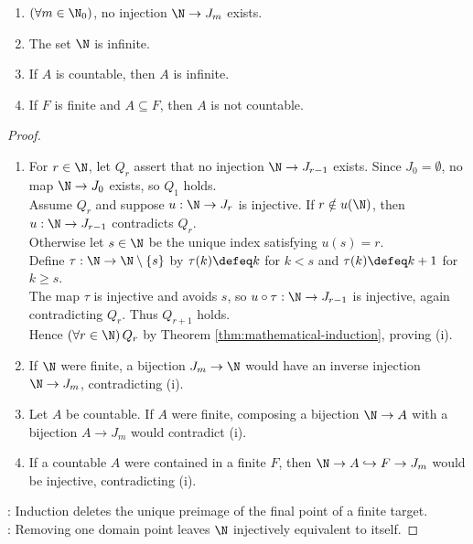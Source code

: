 \begin{proposition} \label{prop:natural-numbers-do-not-inject-into-finite-sets} 
\begin{enumerate}[label=(\roman*)]
\setlength{\itemsep}{0pt}
\item $(\forall m\in\N_0)$, no injection $\N\to J_m$ exists.
\item The set $\N$ is infinite.
\item If $A$ is countable, then $A$ is infinite.
\item If $F$ is finite and $A\subseteq F$, then $A$ is not countable.
\end{enumerate}
\begin{proof}
\begin{enumerate}[label=(\roman*)]
\setlength{\itemsep}{0pt}
\item For $r\in\N$, let $Q_r$ assert that no injection $\N\to J_{r-1}$ exists. Since $J_0=\emptyset$, no map $\N\to J_0$ exists, so $Q_1$ holds.\\
Assume $Q_r$ and suppose $u:\N\to J_r$ is injective. If $r\notin u(\N)$, then $u:\N\to J_{r-1}$ contradicts $Q_r$.\\
Otherwise let $s\in\N$ be the unique index satisfying $u(s)=r$.\\
Define $\tau:\N\to\N\setminus\{s\}$ by $\tau(k)\defeq k$ for $k<s$ and $\tau(k)\defeq k+1$ for $k\geq s$.\\
The map $\tau$ is injective and avoids $s$, so $u\circ\tau:\N\to J_{r-1}$ is injective, again contradicting $Q_r$. Thus $Q_{r+1}$ holds.\\
Hence $(\forall r\in\N)\,Q_r$ by Theorem \ref{thm:mathematical-induction}, proving (i).
\item If $\N$ were finite, a bijection $J_m\to\N$ would have an inverse injection $\N\to J_m$, contradicting (i).
\item Let $A$ be countable. If $A$ were finite, composing a bijection $\N\to A$ with a bijection $A\to J_m$ would contradict (i).
\item If a countable $A$ were contained in a finite $F$, then $\N\to A\hookrightarrow F\to J_m$ would be injective, contradicting (i).
\end{enumerate}
: Induction deletes the unique preimage of the final point of a finite target.\\
: Removing one domain point leaves $\N$ injectively equivalent to itself.
\end{proof}
\end{proposition}

